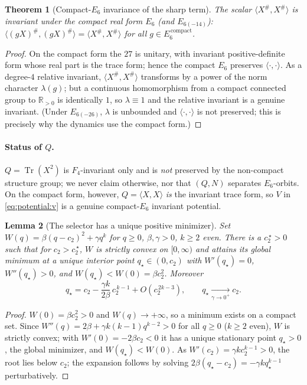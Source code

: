 \documentclass[11pt]{article}
\theoremstyle{plain}
\newtheorem{theorem}{Theorem}[section]
\newtheorem{lemma}[theorem]{Lemma}
\theoremstyle{definition}
\theoremstyle{remark}
\begin{document}
\begin{theorem}[Compact-$E_6$ invariance of the sharp term]
\label{thm:potential:T2}
The scalar $\langle X^\#,X^\#\rangle$ is invariant under the compact real form $E_6$ (and
$E_{6(-14)}$): \ $\langle(gX)^\#,(gX)^\#\rangle=\langle X^\#,X^\#\rangle$ for all
$g\in E_6^{\,\mathrm{compact}}$.
\end{theorem}

\begin{proof}
On the compact form the $27$ is unitary, with invariant positive-definite form whose real
part is the trace form; hence the compact $E_6$ preserves $\langle\cdot,\cdot\rangle$. As a
degree-$4$ relative invariant, $\langle X^\#,X^\#\rangle$ transforms by a power of the norm
character $\lambda(g)$; but a continuous homomorphism from a compact connected group to
$\mathbb R_{>0}$ is identically $1$, so $\lambda\equiv1$ and the relative invariant is a
genuine invariant. (Under $E_{6(-26)}$, $\lambda$ is unbounded and $\langle\cdot,\cdot\rangle$
is not preserved; this is precisely why the dynamics use the compact form.)
\end{proof}

\paragraph{Status of $Q$.}
$Q=\operatorname{Tr}(X^2)$ is $F_4$-invariant only and is \emph{not} preserved by the
non-compact structure group; we never claim otherwise, nor that $(Q,N)$ separates $E_6$-orbits.
On the compact form, however, $Q=\langle X,X\rangle$ \emph{is} the invariant trace form, so
$V$ in \eqref{eq:potential:v} is a genuine compact-$E_6$ invariant potential.

\begin{lemma}[The selector has a unique positive minimizer]
\label{lem:potential:L2}
Set $W(q)=\beta(q-c_2)^2+\gamma q^k$ for $q\ge0$, $\beta,\gamma>0$, $k\ge2$ even. There is a
$c_2^{\,\star}>0$ such that for $c_2>c_2^{\,\star}$, $W$ is strictly convex on $[0,\infty)$ and
attains its global minimum at a unique interior point $q_\star\in(0,c_2)$ with $W'(q_\star)=0$,
$W''(q_\star)>0$, and $W(q_\star)<W(0)=\beta c_2^2$. Moreover
\begin{equation}
\label{eq:potential:qstar}
q_\star=c_2-\frac{\gamma k}{2\beta}\,c_2^{\,k-1}+O(c_2^{\,2k-3}),
\qquad q_\star\xrightarrow[\gamma\to0^+]{}c_2.
\end{equation}
\end{lemma}

\begin{proof}
$W(0)=\beta c_2^2>0$ and $W(q)\to+\infty$, so a minimum exists on a compact set. Since
$W''(q)=2\beta+\gamma k(k-1)q^{k-2}>0$ for all $q\ge0$ ($k\ge2$ even), $W$ is strictly convex;
with $W'(0)=-2\beta c_2<0$ it has a unique stationary point $q_\star>0$, the global minimizer,
and $W(q_\star)<W(0)$. As $W'(c_2)=\gamma k c_2^{k-1}>0$, the root lies below $c_2$; the
expansion follows by solving $2\beta(q_\star-c_2)=-\gamma k q_\star^{k-1}$ perturbatively.
\end{proof}
\end{document}

